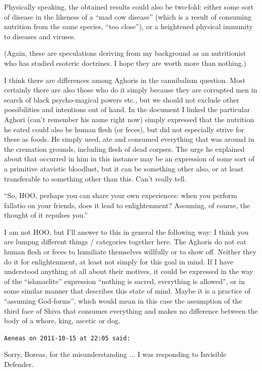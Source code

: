 \begin{footnotesize}
\begin{sffamily}
Physically speaking, the obtained results could also be two-fold: either some sort of disease in the likeness of a ``mad cow disease'' (which is a result of consuming nutrition from the same species, ``too close''), or a heightened physical immunity to diseases and viruses.

(Again, these are speculations deriving from my background as an nutritionist who has studied esoteric doctrines. I hope they are worth more than nothing.)

I think there are differences among Aghoris in the cannibalism question. Most certainly there are also those who do it simply because they are corrupted men in search of black psycho-magical powers etc., but we should not exclude other possibilities and intentions out of hand. In the document I linked the particular Aghori (can't remember his name right now) simply expressed that the nutrition he eated could also be human flesh (or feces), but did not especially strive for these as foods. He simply used, ate and consumed everything that was around in the cremation grounds, including flesh of dead corpses. The urge he explained about that occurred in him in this instance may be an expression of some sort of a primitive atavistic bloodlust, but it can be something other also, or at least transferable to something other than this. Can't really tell.

``So, HOO, perhaps you can share your own experiences: when you perform fallatio on your friends, does it lead to enlightenment? Assuming, of course, the thought of it repulses you.''

I am not HOO, but I'll answer to this in general the following way: I think you are lumpng different things / categories together here. The Aghoris do not eat human flesh or feces to humiliate themselves willfully or to show off. Neither they do it for enlightenment, at least not simply for this goal in mind. If I have understood anything at all about their motives, it could be expressed in the way of the ``ishmaelite'' expression ``nothing is sacred, everything is allowed'', or in some similar manner that describes this state of mind. Maybe it is a practice of ``assuming God-forms'', which would mean in this case the assumption of the third face of Shiva that consumes everything and makes no difference between the body of a whore, king, ascetic or dog.

\hfill

\texttt{Aeneas on 2011-10-15 at 22:05 said:}

Sorry, Boreas, for the misunderstanding ... I was responding to Invisible Defender.


\end{sffamily}
\end{footnotesize}
